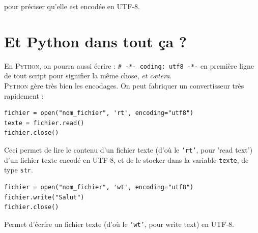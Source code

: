 pour préciser qu'elle est encodée en UTF-8.\\
\section{Et Python dans tout ça ?}
En \textsc{Python}, on pourra aussi écrire : \texttt{# -*- coding: utf8 -*-} en première ligne de tout script pour signifier la même chose, \textit{et c\ae tera}.\\

\textsc{Python} gère très bien les encodages. On peut fabriquer un convertisseur très rapidement :

\begin{pyc}
    \begin{verbatim}
fichier = open("nom_fichier", 'rt', encoding="utf8")
texte = fichier.read()
fichier.close()
    \end{verbatim}
\end{pyc}

Ceci permet de lire le contenu d'un fichier texte (d'où le \texttt{'rt'}, pour 'read text') d'un fichier texte encodé en UTF-8, et de le stocker dans la
variable \texttt{texte}, de type \texttt{str}.\\

\begin{pyc}
    \begin{verbatim}
fichier = open("nom_fichier", 'wt', encoding="utf8")
fichier.write("Salut")
fichier.close()	
    \end{verbatim}
\end{pyc}

Permet d'écrire un fichier texte (d'où le \texttt{'wt'}, pour write text) en UTF-8.\\

